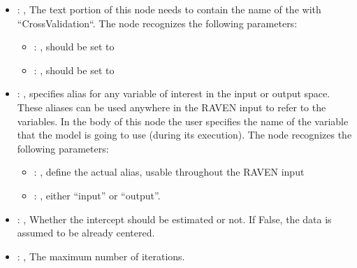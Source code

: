 \begin{itemize}
\begin{itemize}
        \item {}: ,
          List of IDs of features/variables to include in the transformation process.

        \item {}: ,
          Which space to search? Target or Feature?
      \end{itemize}

    \item {}: ,
      The text portion of this node needs to contain the name of the  with
               ``CrossValidation``.
      The  node recognizes the following parameters:
        \begin{itemize}
          \item {}: ,
            should be set to 
          \item {}: ,
            should be set to 
      \end{itemize}

    \item {}: ,
      specifies alias for         any variable of interest in the input or output space. These
      aliases can be used anywhere in the RAVEN input to         refer to the variables. In the body
      of this node the user specifies the name of the variable that the model is going to use
      (during its execution).
      The  node recognizes the following parameters:
        \begin{itemize}
          \item {}: ,
            define the actual alias, usable throughout the RAVEN input
          \item {}: ,
            either ``input'' or ``output''.
      \end{itemize}

    \item {}: ,
      Whether the intercept should be estimated or not. If False,
      the data is assumed to be already centered.

    \item {}: ,
      The maximum number of iterations.


\end{itemize}

